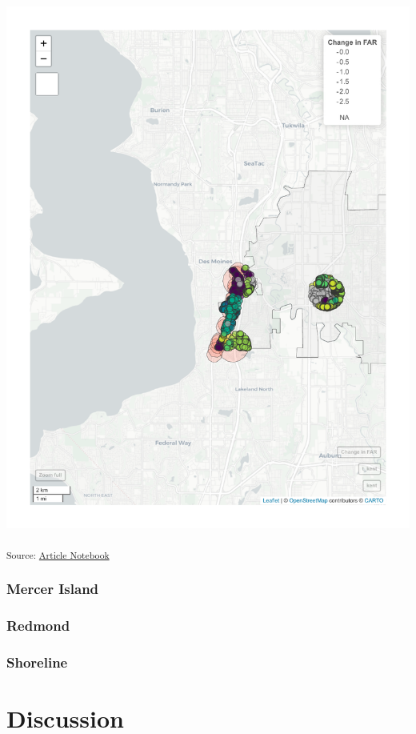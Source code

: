 \documentclass[
]{agujournal2019}
\begin{document}
\includegraphics{index_files/figure-pdf/results-case-studies-kent-parcels-1.pdf}

\textsubscript{Source:
\href{https://tiernanmartin.github.io/2024-transit-oriented-development-bill/index.qmd.html}{Article
Notebook}}

\subsubsection{Mercer Island}\label{mercer-island}

\subsubsection{Redmond}\label{redmond}

\subsubsection{Shoreline}\label{shoreline}

\section{Discussion}\label{discussion}
\end{document}
